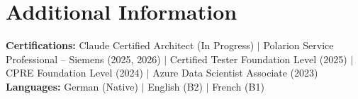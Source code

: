 \documentclass[letterpaper,11pt]{article}
\begin{document}
\section{Additional Information}
 \begin{itemize}[leftmargin=0.15in, label={}]
    \small{\item{
      \textbf{Certifications:} Claude Certified Architect (In Progress) $|$ Polarion Service Professional -- Siemens (2025, 2026) $|$ Certified Tester Foundation Level (2025) $|$ CPRE Foundation Level (2024) $|$ Azure Data Scientist Associate (2023) \\
      \textbf{Languages:} German (Native) $|$ English (B2) $|$ French (B1)
    }}
 \end{itemize}

\end{document}
